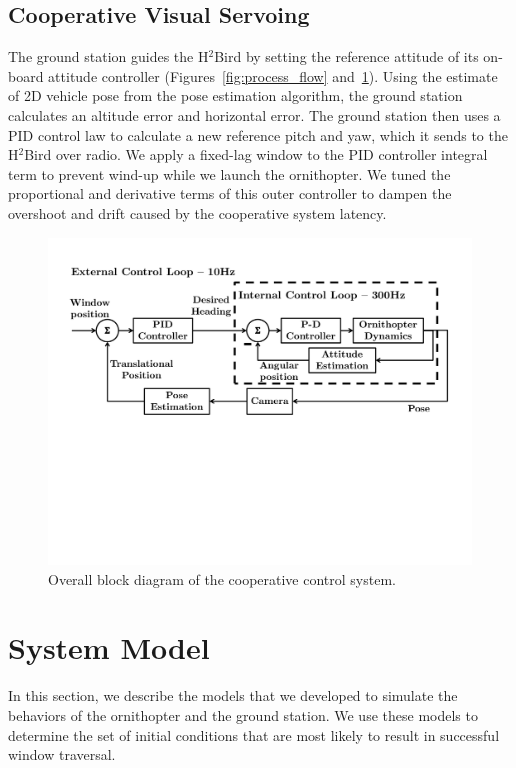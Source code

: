 \documentclass{aamas2013}
\begin{document}
\subsection{Cooperative Visual Servoing}
\label{sec:visual_servoing_concept}
The ground station guides the H$^2$Bird by setting the
reference attitude of its on-board attitude 
controller (Figures~\ref{fig:process_flow} and~\ref{fig:block_diagram}). Using 
the estimate of 2D vehicle pose from the pose estimation algorithm, the 
ground station calculates an altitude error and horizontal error. The ground 
station then uses a PID control law to calculate a new reference pitch and yaw, 
which it sends to the H$^2$Bird over radio. 
We apply a fixed-lag window to the PID 
controller integral term to prevent wind-up while we launch the ornithopter. 
We tuned the proportional and derivative terms of this outer controller to 
dampen the overshoot and drift caused by the cooperative system latency.
\begin{figure}[tb]
\centering
\includegraphics[width=\linewidth]{figures/block_diagrams.pdf}
\caption{Overall block diagram of the cooperative control system.}
\label{fig:block_diagram}
\end{figure}

\section{System Model}
\label{sec:system_model}

In this section, we describe the models that we developed to simulate the
behaviors of the ornithopter and the ground station. We use these models to
determine the set of initial conditions that are most likely to result in
successful window traversal.
\end{document}
